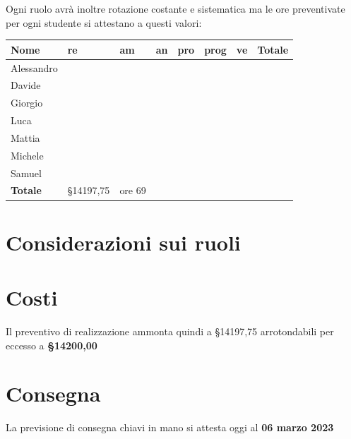 Ogni ruolo avrà inoltre rotazione costante e sistematica ma le ore preventivate per ogni studente si attestano a questi valori:

\begin{center}
    \begin{tabularx}{13cm}{X |l|l|l|l|l|l| X}          
        \textbf{Nome} & \textbf{re} & \textbf{am} & \textbf{an} & \textbf{pro} & \textbf{prog} & \textbf{ve}& \textbf{Totale}\\
        \hline
        Alessandro &  & & & & & & \\
        Davide & & & & & & &\\
        Giorgio & && & & & &\\
        Luca & && & & & &\\
        Mattia &  & & & & & &\\
        Michele &  & & & & & &\\
        Samuel &  & & & & & &\\
        \hline
        \textbf{Totale} & §14197,75 & ore 69& & & & &
    \end{tabularx}
\end{center}

\section{Considerazioni sui ruoli}
\section{Costi}

Il preventivo di realizzazione ammonta quindi a §14197,75 arrotondabili per eccesso a \textbf{§14200,00}

\section{Consegna}

La previsione di consegna chiavi in mano si attesta oggi al \textbf{06 marzo 2023}
